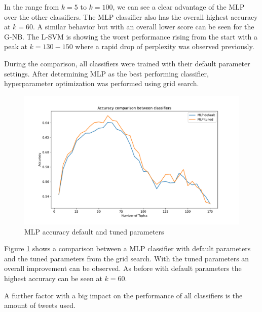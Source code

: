\documentclass[sigconf, nonacm]{acmart}
\begin{document}
In the range from $k=5$ to $k=100$, we can see a clear advantage of the MLP over the other classifiers. The MLP classifier also has the overall highest accuracy at $k=60$.
A similar behavior but with an overall lower score can be seen for the G-NB. 
The L-SVM is showing the worst performance rising from the start with a peak at $k=130-150$ where a rapid drop of perplexity was observed previously.

During the comparison, all classifiers were trained with their default parameter settings. 
After determining MLP as the best performing classifier, hyperparameter optimization was performed using grid search.

\begin{figure}[h]
	\centering
	\includegraphics[width=\linewidth, trim={2cm 0.7cm 2cm 1.7cm}, clip]{figures/MLP_default_vs_tuned/classifier_accuracies_over_topics.pdf}
	\caption{MLP accuracy default and tuned parameters}
	\label{fig:mlp_default_tuned}
\end{figure}

Figure \ref{fig:mlp_default_tuned} shows a comparison between a MLP classifier with default parameters and the tuned parameters from the grid search. 
With the tuned parameters an overall improvement can be observed.
As before with default parameters the highest accuracy can be seen at $k=60$.

A further factor with a big impact on the performance of all classifiers is the amount of tweets used.
\end{document}
